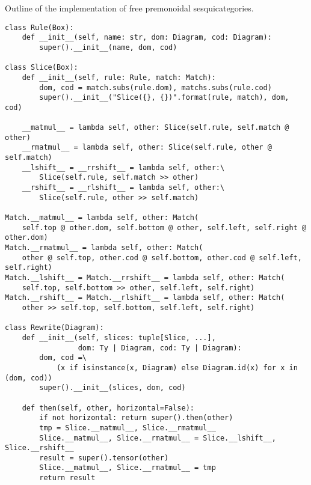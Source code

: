 \begin{python}\label{listing:free-monoidal-2-category}
{\normalfont Outline of the implementation of free premonoidal sesquicategories.}

\begin{verbatim}
class Rule(Box):
    def __init__(self, name: str, dom: Diagram, cod: Diagram):
        super().__init__(name, dom, cod)

class Slice(Box):
    def __init__(self, rule: Rule, match: Match):
        dom, cod = match.subs(rule.dom), matchs.subs(rule.cod)
        super().__init__("Slice({}, {})".format(rule, match), dom, cod)

    __matmul__ = lambda self, other: Slice(self.rule, self.match @ other)
    __rmatmul__ = lambda self, other: Slice(self.rule, other @ self.match)
    __lshift__ = __rrshift__ = lambda self, other:\
        Slice(self.rule, self.match >> other)
    __rshift__ = __rlshift__ = lambda self, other:\
        Slice(self.rule, other >> self.match)

Match.__matmul__ = lambda self, other: Match(
    self.top @ other.dom, self.bottom @ other, self.left, self.right @ other.dom)
Match.__rmatmul__ = lambda self, other: Match(
    other @ self.top, other.cod @ self.bottom, other.cod @ self.left, self.right)
Match.__lshift__ = Match.__rrshift__ = lambda self, other: Match(
    self.top, self.bottom >> other, self.left, self.right)
Match.__rshift__ = Match.__rlshift__ = lambda self, other: Match(
    other >> self.top, self.bottom, self.left, self.right)

class Rewrite(Diagram):
    def __init__(self, slices: tuple[Slice, ...],
                 dom: Ty | Diagram, cod: Ty | Diagram):
        dom, cod =\
            (x if isinstance(x, Diagram) else Diagram.id(x) for x in (dom, cod))
        super().__init__(slices, dom, cod)

    def then(self, other, horizontal=False):
        if not horizontal: return super().then(other)
        tmp = Slice.__matmul__, Slice.__rmatmul__
        Slice.__matmul__, Slice.__rmatmul__ = Slice.__lshift__, Slice.__rshift__
        result = super().tensor(other)
        Slice.__matmul__, Slice.__rmatmul__ = tmp
        return result
\end{verbatim}
\end{python}

